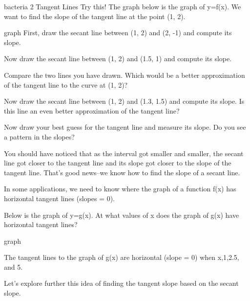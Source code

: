  bacteria 2
Tangent Lines
Try this!
The graph below is the graph of y=f(x). We want to find the slope of the tangent line at the point (1, 2).

graph
First, draw the secant line between (1, 2) and (2, -1) and compute its slope.

Now draw the secant line between (1, 2) and (1.5, 1) and compute its slope.

Compare the two lines you have drawn. Which would be a better approximation of the tangent line to the curve at (1, 2)?

Now draw the secant line between (1, 2) and (1.3, 1.5) and compute its slope. Is this line an even better approximation of the tangent line?

Now draw your best guess for the tangent line and measure its slope. Do you see a pattern in the slopes?

You should have noticed that as the interval got smaller and smaller, the secant line got closer to the tangent line and its slope got closer to the slope of the tangent line. That’s good news–we know how to find the slope of a secant line.

In some applications, we need to know where the graph of a function f(x) has horizontal tangent lines (slopes = 0).

\begin{example}
Below is the graph of y=g(x). At what values of x does the graph of g(x) have horizontal tangent lines?

graph
\begin{solution}
The tangent lines to the graph of g(x) are horizontal (slope = 0) when x,1,2.5, and 5.
\end{solution}\end{example}

Let's explore further this idea of finding the tangent slope based on the secant slope.


